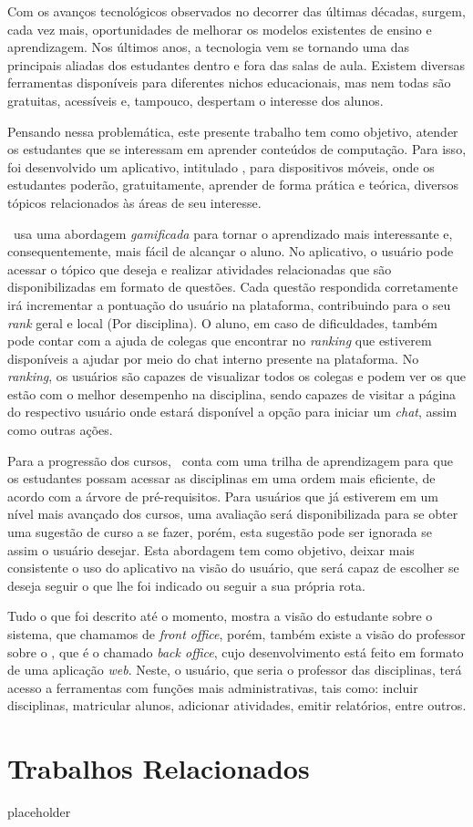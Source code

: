 Com os avanços tecnológicos observados no decorrer das últimas décadas, surgem, cada vez mais, oportunidades de melhorar os modelos existentes de ensino e aprendizagem. Nos últimos anos, a tecnologia vem se tornando uma das principais aliadas dos estudantes dentro e fora das salas de aula. Existem diversas ferramentas disponíveis para diferentes nichos educacionais, mas nem todas são gratuitas, acessíveis e, tampouco, despertam o interesse dos alunos.

Pensando nessa problemática, este presente trabalho tem como objetivo, atender os estudantes que se interessam em aprender conteúdos de computação. Para isso, foi desenvolvido um aplicativo, intitulado \appName, para dispositivos móveis, onde os estudantes poderão, gratuitamente, aprender de forma prática e teórica, diversos tópicos relacionados às áreas de seu interesse.

\appName\ usa uma abordagem \textit{gamificada} para tornar o aprendizado mais interessante e, consequentemente, mais fácil de alcançar o aluno. No aplicativo, o usuário pode acessar o tópico que deseja e realizar atividades relacionadas que são disponibilizadas em formato de questões. Cada questão respondida corretamente irá incrementar a pontuação do usuário na plataforma, contribuindo para o seu \textit{rank} geral e local (Por disciplina). O aluno, em caso de dificuldades, também pode contar com a ajuda de colegas que encontrar no \textit{ranking} que estiverem disponíveis a ajudar por meio do chat interno presente na plataforma. No \textit{ranking}, os usuários são capazes de visualizar todos os colegas e podem ver os que estão com o melhor desempenho na disciplina, sendo capazes de visitar a página do respectivo usuário onde estará disponível a opção para iniciar um \textit{chat}, assim como outras ações.

Para a progressão dos cursos, \appName\ conta com uma trilha de aprendizagem para que os estudantes possam acessar as disciplinas em uma ordem mais eficiente, de acordo com a árvore de pré-requisitos. Para usuários que já estiverem em um nível mais avançado dos cursos, uma avaliação será disponibilizada para se obter uma sugestão de curso a se fazer, porém, esta sugestão pode ser ignorada se assim o usuário desejar. Esta abordagem tem como objetivo, deixar mais consistente o uso do aplicativo na visão do usuário, que será capaz de escolher se deseja seguir o que lhe foi indicado ou seguir a sua própria rota.

Tudo o que foi descrito até o momento, mostra a visão do estudante sobre o sistema, que chamamos de \textit{front office}, porém, também existe a visão do professor sobre o \appName, que é o chamado \textit{back office}, cujo desenvolvimento está feito em formato de uma aplicação \textit{web}. Neste, o usuário, que seria o professor das disciplinas, terá acesso a ferramentas com funções mais administrativas, tais como: incluir disciplinas, matricular alunos, adicionar atividades, emitir relatórios, entre outros.

\section{Trabalhos Relacionados}

placeholder
